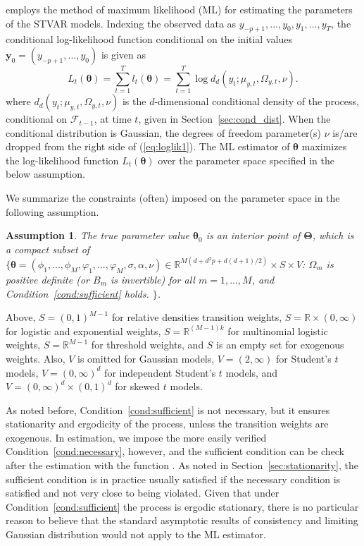 \documentclass[nojss]{jss}
\newtheorem{assumption}{Assumption}
\begin{document}
 employs the method of maximum likelihood (ML) for estimating the parameters of the STVAR models. Indexing the observed data as $y_{-p+1},...,y_0,y_1,...,y_T$, the conditional log-likelihood function conditional on the initial values $\boldsymbol{y}_0=(y_{-p+1},...,y_0)$ is given as
\begin{equation}\label{eq:loglik1}
L_t(\boldsymbol{\theta})=\sum_{t=1}^T l_t(\boldsymbol{\theta}) = \sum_{t=1}^T \log d_d(y_t;\mu_{y,t},\Omega_{y,t},\nu).
\end{equation}
where $d_d(y_t;\mu_{y,t},\Omega_{y,t},\nu)$ is the $d$-dimensional conditional density of the process, conditional on $\mathcal{F}_{t-1}$, at time $t$, given in Section~\ref{sec:cond_dist}. When the conditional distribution is Gaussian, the degrees of freedom parameter(s) $\nu$ is/are dropped from the right side of (\ref{eq:loglik1}). The ML estimator of $\boldsymbol{\theta}$ maximizes the log-likelihood function $L_t(\boldsymbol{\theta})$ over the parameter space specified in the below assumption.

We summarize the constraints (often) imposed on the parameter space in the following assumption.
%
\begin{assumption}\label{as:mle}
The true parameter value $\boldsymbol{\theta}_0$ is an interior point of $\boldsymbol{\Theta}$, which is a compact subset of
$\lbrace \boldsymbol{\theta}=(\phi_{1},...,\phi_M,\varphi_1,...,\varphi_M,\sigma,\alpha,\nu)\in\mathbb{R}^{M(d + d^2p + d(d+1)/2)}\times S\times V$: $\Omega_m$ is positive definite (or $B_m$ is invertible) for all $m=1,...,M$, and Condition~\ref{cond:sufficient} holds.
$\rbrace$.
\end{assumption}
%
Above, $S=(0,1)^{M-1}$ for relative densities transition weights, $S=\mathbb{R}\times (0,\infty)$ for logistic and exponential weights, $S=\mathbb{R}^{(M-1)k}$ for multinomial logistic weights, $S=\mathbb{R}^{M-1}$ for threshold weights, and $S$ is an empty set for exogenous weights. Also, $V$ is omitted for Gaussian models, $V=(2, \infty)$ for Student's $t$ models, $V=(0, \infty)^d$ for independent Student's $t$ models, and $V=(0, \infty)^d\times (0,1)^d$ for skewed $t$ models.

As noted before, Condition~\ref{cond:sufficient} is not necessary, but it ensures stationarity and ergodicity of the process, unless the transition weights are exogenous. In estimation, we impose the more easily verified Condition~\ref{cond:necessary}, however, and the sufficient condition can be check after the estimation with the function . As noted in Section~\ref{sec:stationarity}, the sufficient condition is in practice usually satisfied if the necessary condition is satisfied and not very close to being violated. Given that under Condition~\ref{cond:sufficient} the process is ergodic stationary, there is no particular reason to believe that the standard asymptotic results of consistency and limiting Gaussian distribution would not apply to the ML estimator.
\end{document}
